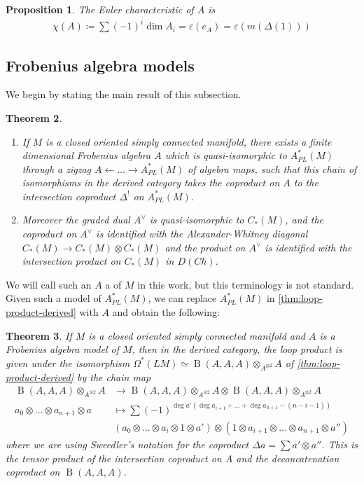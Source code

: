 \documentclass{scrartcl}
\let\emph\relax
\theoremstyle{plain}
\newtheorem{theorem}{Theorem}[section]
\newtheorem{proposition}[theorem]{Proposition}
\theoremstyle{definition}
\renewcommand{\epsilon}{\varepsilon}
\newcommand{\APL}{A_{PL}}
\newcommand{\quiso}{\simeq}
\newcommand{\defeq}{\coloneqq}
\newcommand{\from}{\leftarrow}
\DeclareMathOperator{\BC}{B}
\begin{document}
\begin{proposition}
    The Euler characteristic of $A$ is
    \begin{align*}
        \chi(A) \defeq \sum (-1)^i\dim A_i = \epsilon(e_A) = \epsilon(m(\Delta(1)))
    \end{align*}
\end{proposition}

\subsection{Frobenius algebra models}

We begin by stating the main result of this subsection. 
\begin{theorem}\label{thm:frobenius-model}
    \begin{enumerate}
    \item If $M$ is a closed oriented simply connected manifold, there exists a finite dimensional Frobenius algebra $A$ which is quasi-isomorphic to $\APL^*(M)$ through a zigzag $A\from \dots\to \APL^*(M)$ of algebra maps, such that this chain of isomorphisms in the derived category takes the coproduct on $A$ to the intersection coproduct $\Delta^!$ on $\APL^*(M)$. 
    
    \item Moreover the graded dual $A^\vee$ is quasi-isomorphic to $C_*(M)$, and the coproduct on $A^\vee$ is identified with the Alexander-Whitney diagonal $C_*(M)\to C_*(M)\otimes C_*(M)$ and the product on $A^\vee$ is identified with the intersection product on $C_*(M)$ in $D(Ch)$.
    \end{enumerate}
\end{theorem}

We will call such an $A$ a \emph{Frobenius algebra model} of $M$ in this work, but this terminology is not standard. Given such a model of $\APL^*(M)$, we can replace $\APL^*(M)$ in \cref{thm:loop-product-derived} with $A$ and obtain the following:

\begin{theorem}
    If $M$ is a closed oriented simply connected manifold and $A$ is a Frobenius algebra model of $M$, then in the derived category, the loop product is given under the isomorphism $\Omega^*(LM)\quiso \BC(A, A, A)\otimes_{A^{\otimes 2}} A$ of \cref{thm:loop-product-derived} by the chain map
    \begin{align*}
        \BC(A, A, A)\otimes_{A^{\otimes 2}} A &\to \BC(A, A, A)\otimes_{A^{\otimes 2}} A \otimes \BC(A, A, A)\otimes_{A^{\otimes 2}} A \\
        a_0\otimes\dots \otimes a_{n+1}\otimes a &\mapsto \sum(-1)^{\deg a'(\deg a_{i+1}+\dots+\deg a_{n+1} - (n-i-1))}\\
        \qquad& (a_0 \otimes\dots\otimes a_i \otimes 1 \otimes a')\otimes (1\otimes a_{i+1}\otimes\dots\otimes a_{n+1}\otimes a'')
    \end{align*}
    where we are using Sweedler's notation for the coproduct $\Delta a = \sum a'\otimes a''$. This is the tensor product of the intersection coproduct on $A$ and the deconcatenation coproduct on $\BC(A, A, A)$.
\end{theorem}
\end{document}
